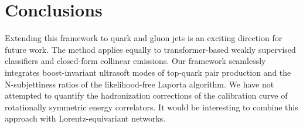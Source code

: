 \section{Conclusions}\label{sec:conclusions}

Extending this framework to quark and gluon jets is an exciting
direction for future work. The method applies equally to
transformer-based weakly supervised classifiers and closed-form
collinear emissions. Our framework seamlessly integrates boost-invariant
ultrasoft modes of top-quark pair production and the N-subjettiness
ratios of the likelihood-free Laporta algorithm. We have not attempted
to quantify the hadronization corrections of the calibration curve of
rotationally symmetric energy correlators. It would be interesting to
combine this approach with Lorentz-equivariant networks.

